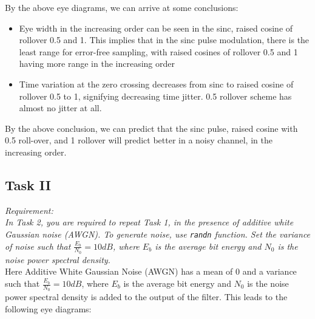 \documentclass{article}
\begin{document}
        \begin{figure}[!htb]
                \centering
        \end{figure}

        By the above eye diagrams, we can arrive at some conclusions:
        \begin{itemize}
            \item Eye width in the increasing order can be seen in the sinc, raised cosine of rollover 0.5 and 1. This implies that in the sinc pulse modulation, there is the least range for error-free sampling, with raised cosines of rollover 0.5 and 1 having more range in the increasing order
            \item Time variation at the zero crossing decreases from sinc to raised cosine of rollover 0.5 to 1, signifying decreasing time jitter. 0.5 rollover scheme has almost no jitter at all.
        \end{itemize} 

        By the above conclusion, we can predict that the sinc pulse, raised cosine with 0.5 roll-over, and 1 rollover will predict better in a noisy channel, in the increasing order. 

        \newpage
        \subsection{Task II}
        \textit{Requirement:\\
        In Task 2, you are required to repeat Task 1, in the presence of additive white Gaussian noise (AWGN). To generate noise, use \texttt{randn} function. Set the variance of noise such that \(\frac{E_b}{N_0} = 10 dB\), where \(E_b\) is the average bit energy and \(N_0\) is the noise power spectral density.}\\

        Here Additive White Gaussian Noise (AWGN) has a mean of 0 and a variance such that \(\frac{E_b}{N_0} = 10 dB\), where \(E_b\) is the average bit energy and \(N_0\) is the noise power spectral density is added to the output of the filter. This leads to the following eye diagrams:
\end{document}
